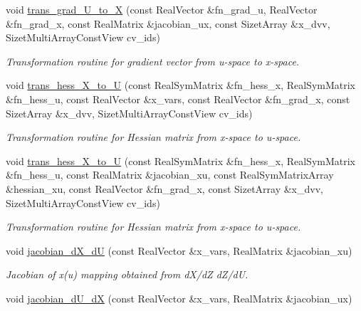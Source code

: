 \begin{DoxyCompactItemize}
void \hyperlink{classPecos_1_1NatafTransformation_aab090e0e7dac78688cfbde1fe2c80ca1}{trans\+\_\+grad\+\_\+\+U\+\_\+to\+\_\+X} (const Real\+Vector \&fn\+\_\+grad\+\_\+u, Real\+Vector \&fn\+\_\+grad\+\_\+x, const Real\+Matrix \&jacobian\+\_\+ux, const Sizet\+Array \&x\+\_\+dvv, Sizet\+Multi\+Array\+Const\+View cv\+\_\+ids)
\begin{DoxyCompactList}\small\item\em Transformation routine for gradient vector from u-\/space to x-\/space. \end{DoxyCompactList}\item 
void \hyperlink{classPecos_1_1NatafTransformation_a834e672f9ac2f1c28b8f6d2f89d7ac85}{trans\+\_\+hess\+\_\+\+X\+\_\+to\+\_\+U} (const Real\+Sym\+Matrix \&fn\+\_\+hess\+\_\+x, Real\+Sym\+Matrix \&fn\+\_\+hess\+\_\+u, const Real\+Vector \&x\+\_\+vars, const Real\+Vector \&fn\+\_\+grad\+\_\+x, const Sizet\+Array \&x\+\_\+dvv, Sizet\+Multi\+Array\+Const\+View cv\+\_\+ids)
\begin{DoxyCompactList}\small\item\em Transformation routine for Hessian matrix from x-\/space to u-\/space. \end{DoxyCompactList}\item 
void \hyperlink{classPecos_1_1NatafTransformation_ad054ed1ba6cb80d20cad29f0efe7da5a}{trans\+\_\+hess\+\_\+\+X\+\_\+to\+\_\+U} (const Real\+Sym\+Matrix \&fn\+\_\+hess\+\_\+x, Real\+Sym\+Matrix \&fn\+\_\+hess\+\_\+u, const Real\+Matrix \&jacobian\+\_\+xu, const Real\+Sym\+Matrix\+Array \&hessian\+\_\+xu, const Real\+Vector \&fn\+\_\+grad\+\_\+x, const Sizet\+Array \&x\+\_\+dvv, Sizet\+Multi\+Array\+Const\+View cv\+\_\+ids)
\begin{DoxyCompactList}\small\item\em Transformation routine for Hessian matrix from x-\/space to u-\/space. \end{DoxyCompactList}\item 
void \hyperlink{classPecos_1_1NatafTransformation_a8e619029699319ac96359e41a74e8744}{jacobian\+\_\+d\+X\+\_\+dU} (const Real\+Vector \&x\+\_\+vars, Real\+Matrix \&jacobian\+\_\+xu)
\begin{DoxyCompactList}\small\item\em Jacobian of x(u) mapping obtained from d\+X/dZ d\+Z/dU. \end{DoxyCompactList}\item 
void \hyperlink{classPecos_1_1NatafTransformation_aa180d3b929eb6f019015fbbff559c0d9}{jacobian\+\_\+d\+U\+\_\+dX} (const Real\+Vector \&x\+\_\+vars, Real\+Matrix \&jacobian\+\_\+ux)

\end{DoxyCompactItemize}
